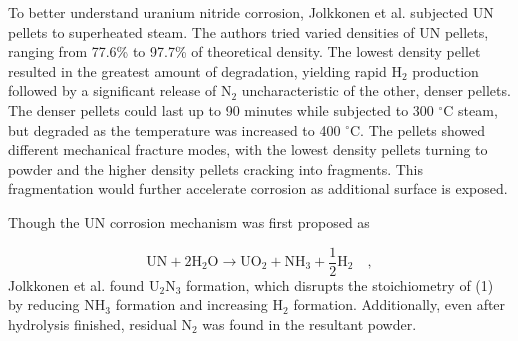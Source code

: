 \documentclass[3p,review,11pt]{elsarticle}
\begin{document}
\par 
To better understand uranium nitride corrosion, Jolkkonen et al. \cite{Jolkkonen2017} subjected UN pellets to superheated steam. The authors tried varied densities of UN pellets, ranging from 77.6\% to 97.7\% of theoretical density. The lowest density pellet resulted in the greatest amount of degradation, yielding rapid H$_{2}$ production followed by a significant release of N$_{2}$ uncharacteristic of the other, denser pellets. The denser pellets could last up to 90 minutes while subjected to 300 $^{\circ}$C steam, but degraded as the temperature was increased to 400 $^{\circ}$C. The pellets showed different mechanical fracture modes, with the lowest density pellets turning to powder and the higher density pellets cracking into fragments. This fragmentation would further accelerate corrosion as additional surface is exposed.
\par 
Though the UN corrosion mechanism was first proposed as 

\begin{equation}
\mbox{UN} + 2\mbox{H}_{2}\mbox{O} \rightarrow \mbox{UO}_{2} + \mbox{NH}_{3} + \frac{1}{2} \mbox{H}_{2} \quad ,
\end{equation}
Jolkkonen et al. found U$_{2}$N$_{3}$ formation, which disrupts the stoichiometry of (1) by reducing NH$_{3}$ formation and increasing H$_{2}$ formation. Additionally, even after hydrolysis finished, residual N$_{2}$ was found in the resultant powder.
\end{document}
